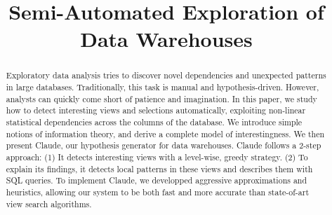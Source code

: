 \documentclass{sig-alternate}
\begin{document}
\title{Semi-Automated Exploration of Data Warehouses}



\maketitle

\begin{abstract}
Exploratory data analysis tries to discover novel dependencies and unexpected
patterns in large databases. Traditionally, this task is manual and
hypothesis-driven. However, analysts can quickly come short of patience and
imagination. In this paper, we study how to detect interesting views and
selections automatically, exploiting non-linear statistical dependencies across
the columns of the database. We introduce simple notions of information theory,
and derive a complete model of interestingness. We then present Claude, our
hypothesis generator for data warehouses. Claude follows a 2-step approach: (1)
It detects interesting views with a level-wise, greedy strategy.  (2) To
explain its findings, it detects local patterns in these views and describes
them with SQL queries.  To implement Claude, we developped aggressive
approximations and heuristics, allowing our system to be both fast and more
accurate than state-of-art view search algorithms. 
\end{abstract}




\balancecolumns
\end{document}

